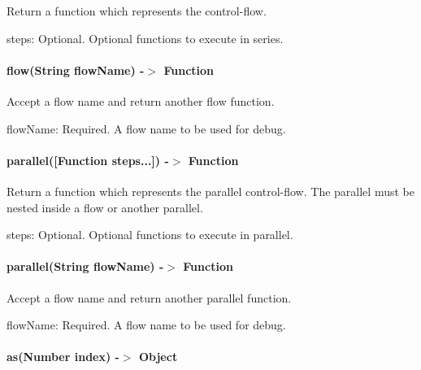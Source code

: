 Return a function which represents the control-\/flow.


\begin{DoxyItemize}
\item {\ttfamily steps}\+: Optional. Optional functions to execute in series.
\end{DoxyItemize}

\paragraph*{flow(\+String flow\+Name) -\/$>$ Function}

Accept a flow name and return another {\ttfamily flow} function.


\begin{DoxyItemize}
\item {\ttfamily flow\+Name}\+: Required. A flow name to be used for debug.
\end{DoxyItemize}

\paragraph*{parallel(\mbox{[}Function steps...\mbox{]}) -\/$>$ Function}

Return a function which represents the parallel control-\/flow. The {\ttfamily parallel} must be nested inside a {\ttfamily flow} or another {\ttfamily parallel}.


\begin{DoxyItemize}
\item {\ttfamily steps}\+: Optional. Optional functions to execute in parallel.
\end{DoxyItemize}

\paragraph*{parallel(\+String flow\+Name) -\/$>$ Function}

Accept a flow name and return another {\ttfamily parallel} function.


\begin{DoxyItemize}
\item {\ttfamily flow\+Name}\+: Required. A flow name to be used for debug.
\end{DoxyItemize}

\paragraph*{as(\+Number index) -\/$>$ Object}


